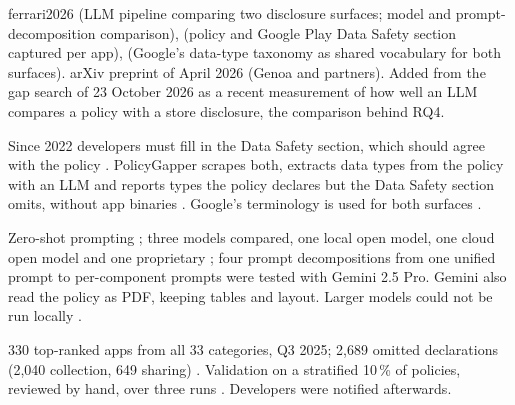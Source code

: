 \begin{papercard}{ferrari2026}
  (LLM pipeline comparing two disclosure surfaces; model and prompt-decomposition comparison),  (policy and Google Play Data Safety section captured per app),  (Google's data-type taxonomy as shared vocabulary for both surfaces). arXiv preprint of April 2026 (Genoa and partners). Added from the gap search of 23 October 2026 as a recent measurement of how well an LLM compares a policy with a store disclosure, the comparison behind RQ4.

 Since 2022 developers must fill in the Data Safety section, which should agree with the policy . PolicyGapper scrapes both, extracts data types from the policy with an LLM and reports types the policy declares but the Data Safety section omits, without app binaries . Google's terminology is used for both surfaces .

 Zero-shot prompting ; three models compared, one local open model, one cloud open model and one proprietary ; four prompt decompositions from one unified prompt to per-component prompts were tested with Gemini 2.5 Pro. Gemini also read the policy as PDF, keeping tables and layout. Larger models could not be run locally .

 330 top-ranked apps from all 33 categories, Q3 2025; 2,689 omitted declarations (2,040 collection, 649 sharing) . Validation on a stratified 10\,\% of policies, reviewed by hand, over three runs . Developers were notified afterwards.


\end{papercard}
